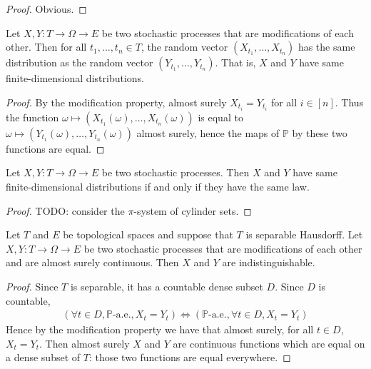 \begin{proof}\leanok
Obvious.
\end{proof}


\begin{lemma}\label{lem:map_eq_of_modification}
  \mathlibok
Let $X, Y : T \to \Omega \to E$ be two stochastic processes that are modifications of each other.
Then for all $t_1, \ldots, t_n \in T$, the random vector $(X_{t_1}, \ldots, X_{t_n})$ has the same distribution as the random vector $(Y_{t_1}, \ldots, Y_{t_n})$.
That is, $X$ and $Y$ have same finite-dimensional distributions.
\end{lemma}

\begin{proof}By the modification property, almost surely $X_{t_i} = Y_{t_i}$ for all $i \in [n]$.
Thus the function $\omega \mapsto (X_{t_1}(\omega), \ldots, X_{t_n}(\omega))$ is equal to $\omega \mapsto (Y_{t_1}(\omega), \ldots, Y_{t_n}(\omega))$ almost surely, hence the maps of $\mathbb{P}$ by these two functions are equal.
\end{proof}


\begin{lemma}\label{lem:map_eq_iff}
  \mathlibok
Let $X, Y : T \to \Omega \to E$ be two stochastic processes.
Then $X$ and $Y$ have same finite-dimensional distributions if and only if they have the same law.
\end{lemma}

\begin{proof}TODO: consider the $\pi$-system of cylinder sets.
\end{proof}


\begin{lemma}\label{lem:indistinguishable_of_modification_of_continuous}
  \leanok
Let $T$ and $E$ be topological spaces and suppose that $T$ is separable Hausdorff.
Let $X, Y : T \to \Omega \to E$ be two stochastic processes that are modifications of each other and are almost surely continuous.
Then $X$ and $Y$ are indistinguishable.
\end{lemma}

\begin{proof}\leanok
Since $T$ is separable, it has a countable dense subset $D$.
Since $D$ is countable,
\begin{align*}
  (\forall t \in D, \mathbb{P}\text{-a.e.}, X_t = Y_t)
  \iff (\mathbb{P}\text{-a.e.}, \forall t \in D, X_t = Y_t)
\end{align*}
Hence by the modification property we have that almost surely, for all $t \in D$, $X_t = Y_t$.
Then almost surely $X$ and $Y$ are continuous functions which are equal on a dense subset of $T$: those two functions are equal everywhere.
\end{proof}
